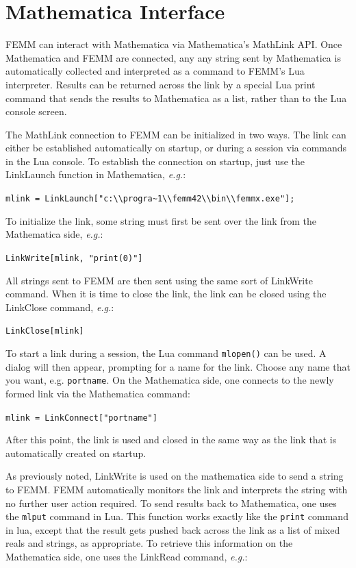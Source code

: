 \chapter{Mathematica Interface}

FEMM can interact with Mathematica via Mathematica's MathLink API. Once Mathematica and FEMM are connected, any
any string sent by Mathematica is automatically collected and interpreted as a command to FEMM's Lua interpreter.
Results can be returned across the link by a special Lua print command that sends the results to Mathematica
as a list, rather than to the Lua console screen.

The MathLink connection to FEMM can be initialized in two ways.  The link can either be established
automatically on startup, or during a session via commands in the Lua console.  To establish the connection on
startup, just use the LinkLaunch function in Mathematica, {\em e.g.}:

\verb+mlink = LinkLaunch["c:\\progra~1\\femm42\\bin\\femmx.exe"];+

To initialize the link, some string must first be sent over the link from the Mathematica side, {\em e.g.}:

\verb+LinkWrite[mlink, "print(0)"]+

All strings sent to FEMM are then sent using the same sort of LinkWrite command. When it is time to close the link,
the link can be closed using the LinkClose command, {\em e.g.}:

\verb+LinkClose[mlink]+

To start a link during a session, the Lua command {\tt mlopen()} can be used.  A dialog will then appear, prompting
for a name for the link.  Choose any name that you want, e.g. {\tt portname}.  On the Mathematica side, one connects
to the newly formed link via the Mathematica command:

\verb+mlink = LinkConnect["portname"]+

After this point, the link is used and closed in the same way as the link that is automatically created on startup.

As previously noted, LinkWrite is used on the mathematica side to send a string to FEMM.  FEMM automatically monitors
the link and interprets the string with no further user action required.  To send results back to Mathematica, one
uses the {\tt mlput} command in Lua.  This function works exactly like the {\tt print} command in lua, except that
the result gets pushed back across the link as a list of mixed reals and strings, as appropriate.  To retrieve this
information on the Mathematica side, one uses the LinkRead command, {\em e.g.}:

